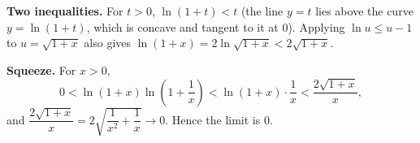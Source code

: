 \textbf{Two inequalities.} For $t>0$, $\ln(1+t)<t$ (the line $y=t$ lies above the curve $y=\ln(1+t)$, which is concave and tangent to it at $0$). Applying $\ln u\le u-1$ to $u=\sqrt{1+x}$ also gives $\ln(1+x)=2\ln\sqrt{1+x}<2\sqrt{1+x}$.

\textbf{Squeeze.} For $x>0$,
\[0<\ln(1+x)\ln\left(1+\dfrac1x\right)<\ln(1+x)\cdot\dfrac1x<\dfrac{2\sqrt{1+x}}{x},\]
and $\dfrac{2\sqrt{1+x}}{x}=2\sqrt{\dfrac1{x^2}+\dfrac1x}\to0$. Hence the limit is $\boxed{0}$.
